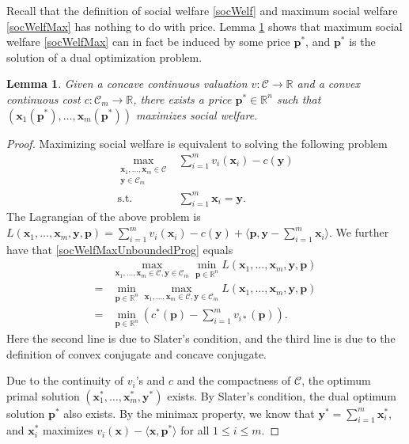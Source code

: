 \documentclass{article}
\newtheorem{lemma}{Lemma}[section]
\begin{document}
Recall that the definition of social welfare \eqref{socWelf} and maximum social welfare \eqref{socWelfMax} has nothing to do with price. Lemma \ref{dualOpt} shows that maximum social welfare \eqref{socWelfMax} can in fact be induced by some price $\mathbf{p}^*$, and $\mathbf{p}^*$ is the solution of a dual optimization problem.
\begin{lemma}\label{dualOpt}
    Given a concave continuous valuation $v:\mathcal{C}\to \mathbb{R}$ and a convex continuous cost $c:\mathcal{C}_m\to \mathbb{R}$, there exists a price $\mathbf{p}^*\in \mathbb{R}^n$ such that $(\mathbf{x}_1(\mathbf{p}^*),\ldots,\mathbf{x}_m(\mathbf{p}^*))$ maximizes social welfare.
\end{lemma}
\begin{proof}
    Maximizing social welfare is equivalent to solving the following problem
    \begin{equation}\label{socWelfMaxUnboundedProg}
        \begin{array}{rl}
            \displaystyle\max_{\substack{\mathbf{x}_1,\ldots,\mathbf{x}_m\in \mathcal{C}\\\mathbf{y}\in \mathcal{C}_m}} & \sum_{i=1}^{m}v_i(\mathbf{x}_i)-c(\mathbf{y}) \\
            \mathrm{s.t.} & \sum_{i=1}^{m}\mathbf{x}_i=\mathbf{y}.
        \end{array}
    \end{equation}
    The Lagrangian of the above problem is $L(\mathbf{x}_1,\ldots,\mathbf{x}_m,\mathbf{y},\mathbf{p})=\sum_{i=1}^{m}v_i(\mathbf{x}_i)-c(\mathbf{y})+\langle \mathbf{p},\mathbf{y}-\sum_{i=1}^{m}\mathbf{x}_i\rangle$. We further have that \eqref{socWelfMaxUnboundedProg} equals
    \begin{equation}
        \begin{array}{cl}
             & \max_{\mathbf{x}_1,\ldots,\mathbf{x}_m\in \mathcal{C},\mathbf{y}\in \mathcal{C}_m}\min_{\mathbf{p}\in \mathbb{R}^n}L(\mathbf{x}_1,\ldots,\mathbf{x}_m,\mathbf{y},\mathbf{p}) \\
            = & \min_{\mathbf{p}\in \mathbb{R}^n}\max_{\mathbf{x}_1,\ldots,\mathbf{x}_m\in \mathcal{C},\mathbf{y}\in \mathcal{C}_m}L(\mathbf{x}_1,\ldots,\mathbf{x}_m,\mathbf{y},\mathbf{p}) \\
            = & \min_{\mathbf{p}\in \mathbb{R}^n}(c^*(\mathbf{p})-\sum_{i=1}^{m}v_{i*}(\mathbf{p})).
        \end{array}
    \end{equation}
    Here the second line is due to Slater's condition, and the third line is due to the definition of convex conjugate and concave conjugate.

    Due to the continuity of $v_i$'s and $c$ and the compactness of $\mathcal{C}$, the optimum primal solution $(\mathbf{x}_1^*,\ldots,\mathbf{x}_m^*,\mathbf{y}^*)$ exists. By Slater's condition, the dual optimum solution $\mathbf{p}^*$ also exists. By the minimax property, we know that $\mathbf{y}^*=\sum_{i=1}^{m}\mathbf{x}_i^*$, and $\mathbf{x}_i^*$ maximizes $v_i(\mathbf{x})-\langle \mathbf{x},\mathbf{p}^*\rangle$ for all $1\le i\le m$.
\end{proof}
\end{document}
